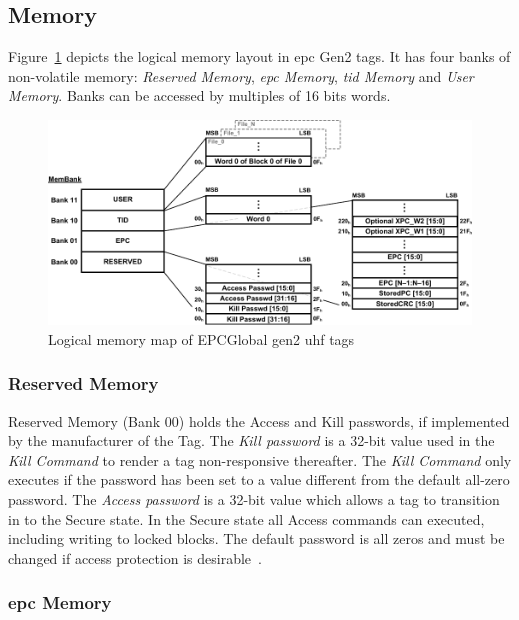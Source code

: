 \subsection{Memory}

Figure~\ref{fig:logicalmemorymap} depicts the logical memory layout in \ac{epc} Gen2 tags. It has four banks of non-volatile memory: \emph{Reserved Memory}, \emph{\ac{epc} Memory}, \emph{\ac{tid} Memory} and \emph{User Memory}. Banks can be accessed by multiples of 16 bits words.

\begin{figure}[!ht]
    \centering
    \includegraphics[width=\textwidth]{./figs/02-state-of-the-art/logicmemorymap.pdf}
    \caption[Logical memory map of EPCGlobal \ac{gen2} \ac{uhf} tags]{Logical memory map of EPCGlobal \ac{gen2} \ac{uhf} tags~\cite{UHFGen2Tag}} 
    \label{fig:logicalmemorymap}
\end{figure}

\subsubsection{Reserved Memory}

Reserved Memory (Bank $00$) holds the Access and Kill passwords, if implemented by the manufacturer of the Tag. 
The \emph{Kill password} is a 32-bit value used in the \emph{Kill Command} to render a tag non-responsive thereafter. The \emph{Kill Command} only executes if the password has been set to a value different from the default all-zero password.
The \emph{Access password} is a 32-bit value which allows a tag to transition in to the Secure state. In the Secure state all Access commands can executed, including writing to locked blocks. The default password is all zeros and must be changed if access protection is desirable~\cite{RFIDEPCGen2,UHFGen2Tag}.

\subsubsection{\ac{epc} Memory}

